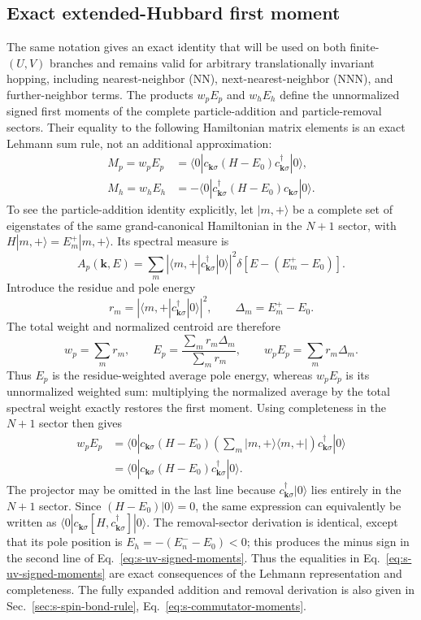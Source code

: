 \documentclass[10pt]{article}
\begin{document}
\subsection{Exact extended-Hubbard first moment}
\label{sec:s-finite-uv-moments}
The same notation gives an exact identity that will be used on both finite-$(U,V)$ branches and remains valid for arbitrary translationally invariant hopping, including nearest-neighbor (NN), next-nearest-neighbor (NNN), and further-neighbor terms. The products $w_pE_p$ and $w_hE_h$ define the unnormalized signed first moments of the complete particle-addition and particle-removal sectors. Their equality to the following Hamiltonian matrix elements is an exact Lehmann sum rule, not an additional approximation:
\begin{align}
 M_p=w_pE_p
 &=\langle0|c_{\mathbf k\sigma}(H-E_0)
 c^\dagger_{\mathbf k\sigma}|0\rangle,\nonumber\\
 M_h=w_hE_h
 &=-\langle0|c^\dagger_{\mathbf k\sigma}(H-E_0)
 c_{\mathbf k\sigma}|0\rangle .
 \label{eq:s-uv-signed-moments}
\end{align}
To see the particle-addition identity explicitly, let $|m,+\rangle$ be a complete set of eigenstates of the same grand-canonical Hamiltonian in the $N+1$ sector, with $H|m,+\rangle=E_m^+|m,+\rangle$. Its spectral measure is
\[
A_p(\mathbf k,E)=\sum_m
\left|\langle m,+|c^\dagger_{\mathbf k\sigma}|0\rangle\right|^2
\delta\!\left[E-(E_m^+-E_0)\right].
\]
Introduce the residue and pole energy
\[
r_m=\left|\langle m,+|c^\dagger_{\mathbf k\sigma}|0\rangle\right|^2,
\qquad \Delta_m=E_m^+-E_0.
\]
The total weight and normalized centroid are therefore
\[
w_p=\sum_m r_m,\qquad
E_p=\frac{\sum_m r_m\Delta_m}{\sum_m r_m},
\qquad
w_pE_p=\sum_m r_m\Delta_m.
\]
Thus $E_p$ is the residue-weighted average pole energy, whereas $w_pE_p$ is its unnormalized weighted sum: multiplying the normalized average by the total spectral weight exactly restores the first moment. Using completeness in the $N+1$ sector then gives
\[
\begin{aligned}
w_pE_p
&=\langle0|c_{\mathbf k\sigma}(H-E_0)
\left(\sum_m|m,+\rangle\langle m,+|\right)
c^\dagger_{\mathbf k\sigma}|0\rangle\\
&=\langle0|c_{\mathbf k\sigma}(H-E_0)
c^\dagger_{\mathbf k\sigma}|0\rangle.
\end{aligned}
\]
The projector may be omitted in the last line because $c^\dagger_{\mathbf k\sigma}|0\rangle$ lies entirely in the $N+1$ sector. Since $(H-E_0)|0\rangle=0$, the same expression can equivalently be written as $\langle0|c_{\mathbf k\sigma}[H,c^\dagger_{\mathbf k\sigma}]|0\rangle$. The removal-sector derivation is identical, except that its pole position is $E_h=-(E_n^--E_0)<0$; this produces the minus sign in the second line of Eq.~\ref{eq:s-uv-signed-moments}. Thus the equalities in Eq.~\ref{eq:s-uv-signed-moments} are exact consequences of the Lehmann representation and completeness. The fully expanded addition and removal derivation is also given in Sec.~\ref{sec:s-spin-bond-rule}, Eq.~\ref{eq:s-commutator-moments}.
\end{document}
